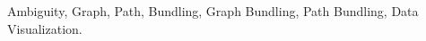 
\begin{abstract}
\end{abstract}

\begin{IEEEkeywords}
Ambiguity, Graph, Path, Bundling, Graph Bundling, Path Bundling, Data Visualization.
\end{IEEEkeywords}
